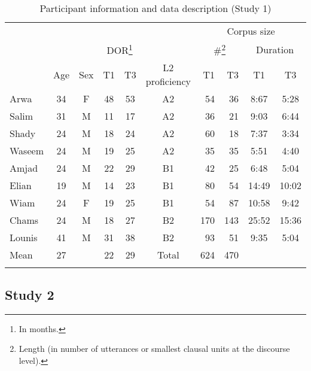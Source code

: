 \documentclass[output=paper]{langscibook}
\begin{document}
\begin{table}
	\begin{tabular}{lcccccrrcc}
		\lsptoprule
		&     &     &  &  &  & \multicolumn{4}{c}{Corpus size}\\\cmidrule(lr){7-10}
		&     &     & \multicolumn{2}{c}{DOR\footnote{In months.}} & &  \multicolumn{2}{c}{\#\footnote{Length (in number of utterances or smallest clausal units at the discourse level).}} & \multicolumn{2}{c}{Duration}\\\cmidrule(lr){4-5}\cmidrule(lr){7-8}\cmidrule(lr){9-10}
		&  Age   & Sex    &  T1  & T3 &    L2 proficiency & T1 & T3 & T1 & T3\\
		\midrule
		{Arwa}   & 34 & F & 48 & 53 & A2 & 54 & 36 & 8:67 &  5:28\\
		{Salim}  & 31 & M & 11 & 17 & A2 & 36 & 21 &  9:03 & 6:44\\
		{Shady}  & 24 & M & 18 & 24 & A2 & 60 & 18 &  7:37 & 3:34\\
		{Waseem} & 24 & M & 19 & 25 & A2 & 35  & 35 &  5:51 & 4:40\\
		{Amjad}  & 24 & M & 22 & 29 & B1 & 42 & 25 &  6:48 & 5:04\\
		{Elian}  & 19 & M & 14 & 23 & B1 & 80  & 54 &  14:49 &  10:02\\
		{Wiam}   & 24 & F & 19 & 25 & B1 & 54  & 87 &  10:58 &  9:42\\
		{Chams}  & 24 & M & 18 & 27 & B2 & 170 & 143 &  25:52 &  15:36\\
		{Lounis} & 41 & M & 31 & 38 & B2 & 93 & 51 & 9:35 & 5:04\\
		\midrule
		Mean      & 27 &   & 22 & 29 &  Total   & 624 & 470 & &  \\
		\lspbottomrule
	\end{tabular}
	\caption{Participant information and data description (Study 1)}
	\label{tab:saddour:2}
\end{table}

\subsection{Study 2}\label{sec:saddour:2.2}
\end{document}
